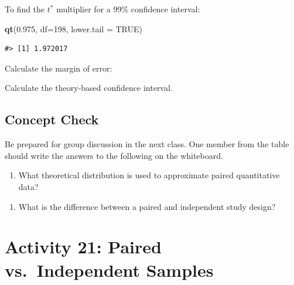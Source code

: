 \documentclass[
]{report}
\newenvironment{Shaded}{\begin{snugshade}}{\end{snugshade}}
\newcommand{\AttributeTok}[1]{\textcolor[rgb]{0.13,0.29,0.53}{#1}}
\newcommand{\ConstantTok}[1]{\textcolor[rgb]{0.56,0.35,0.01}{#1}}
\newcommand{\DecValTok}[1]{\textcolor[rgb]{0.00,0.00,0.81}{#1}}
\newcommand{\FloatTok}[1]{\textcolor[rgb]{0.00,0.00,0.81}{#1}}
\newcommand{\FunctionTok}[1]{\textcolor[rgb]{0.13,0.29,0.53}{\textbf{#1}}}
\newcommand{\NormalTok}[1]{#1}
\providecommand{\tightlist}{%
  \setlength{\itemsep}{0pt}\setlength{\parskip}{0pt}}
\begin{document}
To find the \(t^*\) multiplier for a 99\% confidence interval:

\begin{Shaded}
\begin{Highlighting}[]
\FunctionTok{qt}\NormalTok{(}\FloatTok{0.975}\NormalTok{, }\AttributeTok{df=}\DecValTok{198}\NormalTok{, }\AttributeTok{lower.tail =} \ConstantTok{TRUE}\NormalTok{)}
\end{Highlighting}
\end{Shaded}

\begin{verbatim}
#> [1] 1.972017
\end{verbatim}

Calculate the margin of error:
\vspace{0.4in}

Calculate the theory-based confidence interval.
\vspace{0.5in}

\subsection{Concept Check}\label{concept-check-8}

Be prepared for group discussion in the next class. One member from the table should write the answers to the following on the whiteboard.

\begin{enumerate}
\def\labelenumi{\arabic{enumi}.}
\tightlist
\item
  What theoretical distribution is used to approximate paired quantitative data?
\end{enumerate}

\vspace{0.2in}

\begin{enumerate}
\def\labelenumi{\arabic{enumi}.}
\setcounter{enumi}{1}
\tightlist
\item
  What is the difference between a paired and independent study design?
\end{enumerate}

\vspace{1in}

\newpage

\section{Activity 21: Paired vs.~Independent Samples}\label{activity-21-paired-vs.-independent-samples}
\end{document}
